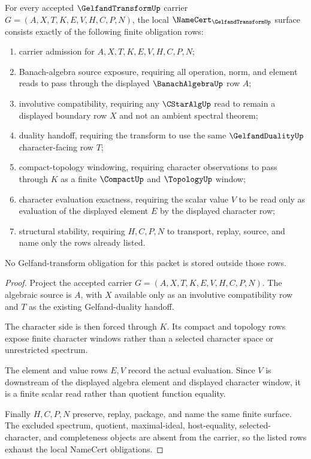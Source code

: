 \begin{theorem}
\label{thm:gelfand-transform-namecert-obligations}
For every accepted $\GelfandTransformUp$ carrier $G=(A,X,T,K,E,V,H,C,P,N)$, the local $\NameCert_{\GelfandTransformUp}$ surface consists exactly of the following finite obligation rows:
\begin{enumerate}
\item carrier admission for $A,X,T,K,E,V,H,C,P,N$;
\item Banach-algebra source exposure, requiring all operation, norm, and element reads to pass through the displayed $\BanachAlgebraUp$ row $A$;
\item involutive compatibility, requiring any $\CStarAlgUp$ read to remain a displayed boundary row $X$ and not an ambient spectral theorem;
\item duality handoff, requiring the transform to use the same $\GelfandDualityUp$ character-facing row $T$;
\item compact-topology windowing, requiring character observations to pass through $K$ as a finite $\CompactUp$ and $\TopologyUp$ window;
\item character evaluation exactness, requiring the scalar value $V$ to be read only as evaluation of the displayed element $E$ by the displayed character row;
\item structural stability, requiring $H,C,P,N$ to transport, replay, source, and name only the rows already listed.
\end{enumerate}
No Gelfand-transform obligation for this packet is stored outside those rows.
\end{theorem}
\begin{proof}
Project the accepted carrier $G=(A,X,T,K,E,V,H,C,P,N)$. The algebraic source is $A$, with $X$ available only as an involutive compatibility row and $T$ as the existing Gelfand-duality handoff.

The character side is then forced through $K$. Its compact and topology rows expose finite character windows rather than a selected character space or unrestricted spectrum.

The element and value rows $E,V$ record the actual evaluation. Since $V$ is downstream of the displayed algebra element and displayed character window, it is a finite scalar read rather than quotient function equality.

Finally $H,C,P,N$ preserve, replay, package, and name the same finite surface. The excluded spectrum, quotient, maximal-ideal, host-equality, selected-character, and completeness objects are absent from the carrier, so the listed rows exhaust the local NameCert obligations.
\end{proof}

